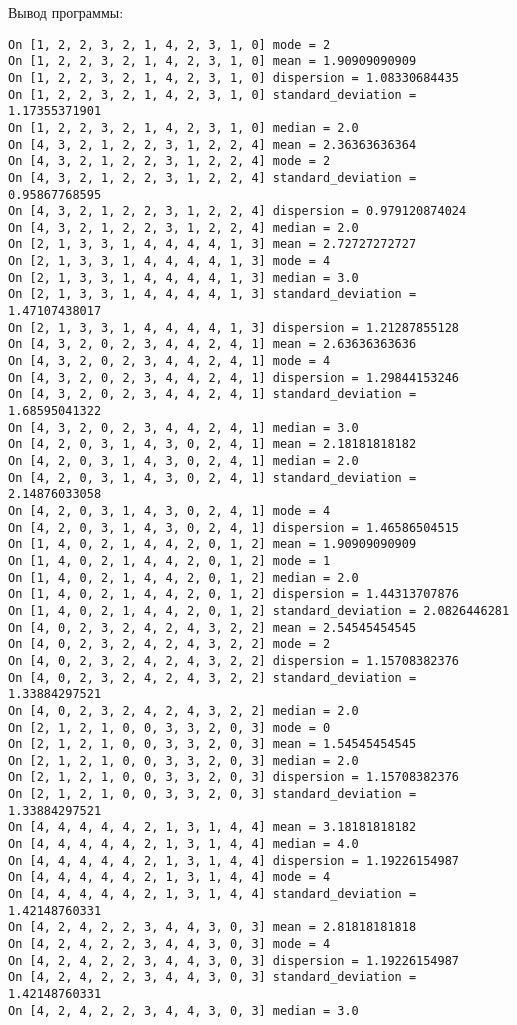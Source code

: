 \documentclass{article} %
\begin{document}
\newpage
Вывод программы:
\begin{verbatim}
On [1, 2, 2, 3, 2, 1, 4, 2, 3, 1, 0] mode = 2
On [1, 2, 2, 3, 2, 1, 4, 2, 3, 1, 0] mean = 1.90909090909
On [1, 2, 2, 3, 2, 1, 4, 2, 3, 1, 0] dispersion = 1.08330684435
On [1, 2, 2, 3, 2, 1, 4, 2, 3, 1, 0] standard_deviation = 1.17355371901
On [1, 2, 2, 3, 2, 1, 4, 2, 3, 1, 0] median = 2.0
On [4, 3, 2, 1, 2, 2, 3, 1, 2, 2, 4] mean = 2.36363636364
On [4, 3, 2, 1, 2, 2, 3, 1, 2, 2, 4] mode = 2
On [4, 3, 2, 1, 2, 2, 3, 1, 2, 2, 4] standard_deviation = 0.95867768595
On [4, 3, 2, 1, 2, 2, 3, 1, 2, 2, 4] dispersion = 0.979120874024
On [4, 3, 2, 1, 2, 2, 3, 1, 2, 2, 4] median = 2.0
On [2, 1, 3, 3, 1, 4, 4, 4, 4, 1, 3] mean = 2.72727272727
On [2, 1, 3, 3, 1, 4, 4, 4, 4, 1, 3] mode = 4
On [2, 1, 3, 3, 1, 4, 4, 4, 4, 1, 3] median = 3.0
On [2, 1, 3, 3, 1, 4, 4, 4, 4, 1, 3] standard_deviation = 1.47107438017
On [2, 1, 3, 3, 1, 4, 4, 4, 4, 1, 3] dispersion = 1.21287855128
On [4, 3, 2, 0, 2, 3, 4, 4, 2, 4, 1] mean = 2.63636363636
On [4, 3, 2, 0, 2, 3, 4, 4, 2, 4, 1] mode = 4
On [4, 3, 2, 0, 2, 3, 4, 4, 2, 4, 1] dispersion = 1.29844153246
On [4, 3, 2, 0, 2, 3, 4, 4, 2, 4, 1] standard_deviation = 1.68595041322
On [4, 3, 2, 0, 2, 3, 4, 4, 2, 4, 1] median = 3.0
On [4, 2, 0, 3, 1, 4, 3, 0, 2, 4, 1] mean = 2.18181818182
On [4, 2, 0, 3, 1, 4, 3, 0, 2, 4, 1] median = 2.0
On [4, 2, 0, 3, 1, 4, 3, 0, 2, 4, 1] standard_deviation = 2.14876033058
On [4, 2, 0, 3, 1, 4, 3, 0, 2, 4, 1] mode = 4
On [4, 2, 0, 3, 1, 4, 3, 0, 2, 4, 1] dispersion = 1.46586504515
On [1, 4, 0, 2, 1, 4, 4, 2, 0, 1, 2] mean = 1.90909090909
On [1, 4, 0, 2, 1, 4, 4, 2, 0, 1, 2] mode = 1
On [1, 4, 0, 2, 1, 4, 4, 2, 0, 1, 2] median = 2.0
On [1, 4, 0, 2, 1, 4, 4, 2, 0, 1, 2] dispersion = 1.44313707876
On [1, 4, 0, 2, 1, 4, 4, 2, 0, 1, 2] standard_deviation = 2.0826446281
On [4, 0, 2, 3, 2, 4, 2, 4, 3, 2, 2] mean = 2.54545454545
On [4, 0, 2, 3, 2, 4, 2, 4, 3, 2, 2] mode = 2
On [4, 0, 2, 3, 2, 4, 2, 4, 3, 2, 2] dispersion = 1.15708382376
On [4, 0, 2, 3, 2, 4, 2, 4, 3, 2, 2] standard_deviation = 1.33884297521
On [4, 0, 2, 3, 2, 4, 2, 4, 3, 2, 2] median = 2.0
On [2, 1, 2, 1, 0, 0, 3, 3, 2, 0, 3] mode = 0
On [2, 1, 2, 1, 0, 0, 3, 3, 2, 0, 3] mean = 1.54545454545
On [2, 1, 2, 1, 0, 0, 3, 3, 2, 0, 3] median = 2.0
On [2, 1, 2, 1, 0, 0, 3, 3, 2, 0, 3] dispersion = 1.15708382376
On [2, 1, 2, 1, 0, 0, 3, 3, 2, 0, 3] standard_deviation = 1.33884297521
On [4, 4, 4, 4, 4, 2, 1, 3, 1, 4, 4] mean = 3.18181818182
On [4, 4, 4, 4, 4, 2, 1, 3, 1, 4, 4] median = 4.0
On [4, 4, 4, 4, 4, 2, 1, 3, 1, 4, 4] dispersion = 1.19226154987
On [4, 4, 4, 4, 4, 2, 1, 3, 1, 4, 4] mode = 4
On [4, 4, 4, 4, 4, 2, 1, 3, 1, 4, 4] standard_deviation = 1.42148760331
On [4, 2, 4, 2, 2, 3, 4, 4, 3, 0, 3] mean = 2.81818181818
On [4, 2, 4, 2, 2, 3, 4, 4, 3, 0, 3] mode = 4
On [4, 2, 4, 2, 2, 3, 4, 4, 3, 0, 3] dispersion = 1.19226154987
On [4, 2, 4, 2, 2, 3, 4, 4, 3, 0, 3] standard_deviation = 1.42148760331
On [4, 2, 4, 2, 2, 3, 4, 4, 3, 0, 3] median = 3.0
\end{verbatim}
\end{document}
